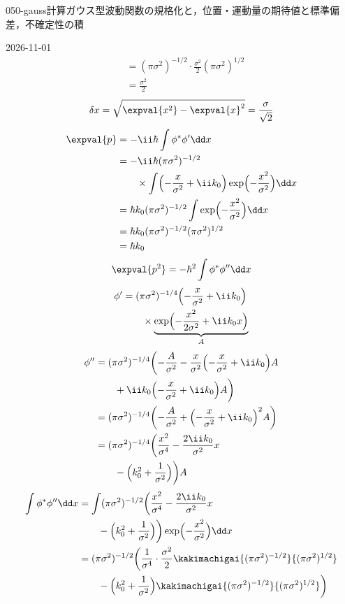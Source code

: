 \documentclass[uplatex,dvipdfmx,a4paper,11pt]{jsarticle}
\begin{document}
\begin{mondai}{050-gauss}{計算}{ガウス型波動関数の規格化と，位置・運動量の期待値と標準偏差，不確定性の積}
\begin{kotaeutsushi}{2026-11-01}
\begin{align*}
&=(\pi\sigma^{2})^{-1/2}\cdot\frac{\sigma^{2}}{2}(\pi\sigma^{2})^{1/2}\\
&=\frac{\sigma^{2}}{2}
\end{align*}
\[ \delta x=\sqrt{\expval{x^{2}}-\expval{x}^{2}}=\frac{\sigma}{\sqrt{2}} \]
\begin{align*}
\expval{p}&=-\ii\hbar\int\phi^{*}\phi'\dd x\\
&=-\ii\hbar(\pi\sigma^{2})^{-1/2}\\
&\qquad\times\int\Bigl(-\frac{x}{\sigma^{2}}+\ii k_{0}\Bigr)\exp\Bigl(-\frac{x^{2}}{\sigma^{2}}\Bigr)\dd x\\
&=\hbar k_{0}(\pi\sigma^{2})^{-1/2}\int\exp\Bigl(-\frac{x^{2}}{\sigma^{2}}\Bigr)\dd x\\
&=\hbar k_{0}(\pi\sigma^{2})^{-1/2}(\pi\sigma^{2})^{1/2}\\
&=\hbar k_{0}
\end{align*}
\[ \expval{p^{2}}=-\hbar^{2}\int\phi^{*}\phi''\dd x \]
\begin{align*}
\phi'&=(\pi\sigma^{2})^{-1/4}\Bigl(-\frac{x}{\sigma^{2}}+\ii k_{0}\Bigr)\\
&\qquad\times\underbrace{\exp\Bigl(-\frac{x^{2}}{2\sigma^{2}}+\ii k_{0}x\Bigr)}_{A}
\end{align*}
\begin{align*}
\phi''&=(\pi\sigma^{2})^{-1/4}\biggl(-\frac{A}{\sigma^{2}}-\frac{x}{\sigma^{2}}\Bigl(-\frac{x}{\sigma^{2}}+\ii k_{0}\Bigr)A\\
&\qquad+\ii k_{0}\Bigl(-\frac{x}{\sigma^{2}}+\ii k_{0}\Bigr)A\biggr)\\
&=(\pi\sigma^{2})^{-1/4}\biggl(-\frac{A}{\sigma^{2}}+\Bigl(-\frac{x}{\sigma^{2}}+\ii k_{0}\Bigr)^{2}A\biggr)\\
&=(\pi\sigma^{2})^{-1/4}\biggl(\frac{x^{2}}{\sigma^{4}}-\frac{2\ii k_{0}}{\sigma^{2}}x\\
&\qquad-\Bigl(k_{0}^{2}+\frac{1}{\sigma^{2}}\Bigr)\biggr)A
\end{align*}
\begin{align*}
\int\phi^{*}\phi''\dd x&=\int(\pi\sigma^{2})^{-1/2}\biggl(\frac{x^{2}}{\sigma^{4}}-\frac{2\ii k_{0}}{\sigma^{2}}x\\
&\qquad-\Bigl(k_{0}^{2}+\frac{1}{\sigma^{2}}\Bigr)\biggr)\exp\Bigl(-\frac{x^{2}}{\sigma^{2}}\Bigr)\dd x\\
&=(\pi\sigma^{2})^{-1/2}\biggl(\frac{1}{\sigma^{4}}\cdot\frac{\sigma^{2}}{2}\kakimachigai{(\pi\sigma^{2})^{-1/2}}{(\pi\sigma^{2})^{1/2}}\\
&\qquad-\Bigl(k_{0}^{2}+\frac{1}{\sigma^{2}}\Bigr)\kakimachigai{(\pi\sigma^{2})^{-1/2}}{(\pi\sigma^{2})^{1/2}}\biggr)\\

\end{align*}
\end{kotaeutsushi}
\end{mondai}
\end{document}
